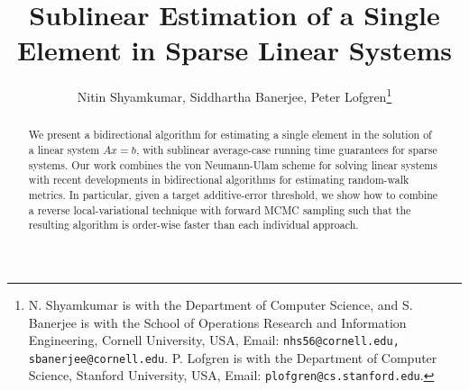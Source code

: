 \documentclass[letterpaper,conference]{ieeeconf}
\begin{document}


\title{Sublinear Estimation of a Single Element in Sparse Linear Systems}


\author{Nitin Shyamkumar, Siddhartha Banerjee, Peter Lofgren\thanks{N. Shyamkumar is with the Department of Computer Science, and S. Banerjee is with the School of Operations Research and Information Engineering, Cornell University, USA, Email: {\tt nhs56@cornell.edu, sbanerjee@cornell.edu}. P. Lofgren is with the Department of Computer Science, Stanford University, USA, Email: {\tt plofgren@cs.stanford.edu}.}}

\maketitle

\begin{abstract}
We present a bidirectional algorithm for estimating a single element in the solution of a linear system $Ax=b$, with sublinear average-case running time guarantees for sparse systems.
Our work combines the von Neumann-Ulam scheme for solving linear systems with recent developments in bidirectional
algorithms for estimating random-walk metrics. 
In particular, given a target additive-error threshold, we show how to combine a reverse local-variational technique with forward MCMC sampling such that the resulting algorithm is order-wise faster than each individual approach.      
\end{abstract}








 
\end{document}
